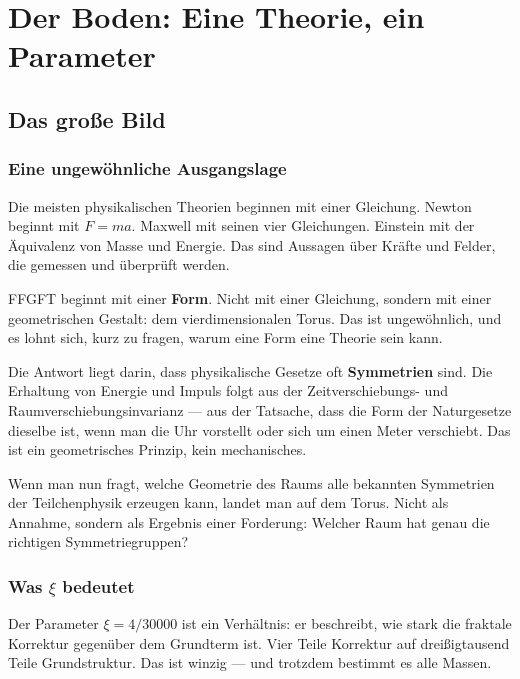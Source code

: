 \documentclass[12pt,oneside]{book}
\begin{document}
\mainmatter

\part{Der Boden: Eine Theorie, ein Parameter}

\chapter{Das große Bild}

\section{Eine ungewöhnliche Ausgangslage}

Die meisten physikalischen Theorien beginnen mit einer Gleichung. Newton beginnt mit $F = ma$. Maxwell mit seinen vier Gleichungen. Einstein mit der Äquivalenz von Masse und Energie. Das sind Aussagen über Kräfte und Felder, die gemessen und überprüft werden.

FFGFT beginnt mit einer \textbf{Form}. Nicht mit einer Gleichung, sondern mit einer geometrischen Gestalt: dem vier\-dimen\-sio\-nalen Torus. Das ist ungewöhnlich, und es lohnt sich, kurz zu fragen, warum eine Form eine Theorie sein kann.

Die Antwort liegt darin, dass physikalische Gesetze oft \textbf{Symmetrien} sind. Die Erhaltung von Energie und Impuls folgt aus der Zeitverschiebungs- und Raumverschiebungsinvarianz — aus der Tatsache, dass die Form der Naturgesetze dieselbe ist, wenn man die Uhr vorstellt oder sich um einen Meter verschiebt. Das ist ein geometrisches Prinzip, kein mechanisches.

Wenn man nun fragt, welche Geometrie des Raums alle bekannten Symmetrien der Teilchenphysik erzeugen kann, landet man auf dem Torus. Nicht als Annahme, sondern als Ergebnis einer Forderung: Welcher Raum hat genau die richtigen Sym\-metrie\-gruppen?

\section{Was $\xi$ bedeutet}

Der Parameter $\xi = 4/30000$ ist ein Verhältnis: er beschreibt, wie stark die fraktale Korrektur gegenüber dem Grundterm ist. Vier Teile Korrektur auf dreißigtausend Teile Grundstruktur. Das ist winzig — und trotzdem bestimmt es alle Massen.
\end{document}
